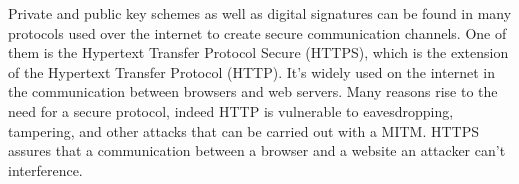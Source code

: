 Private and public key schemes as well as digital signatures can be found in many protocols used over the internet to create secure communication channels. One of them is the Hypertext Transfer Protocol Secure (HTTPS), which is the extension of the Hypertext Transfer Protocol (HTTP). It's widely used on the internet in the communication between browsers and web servers. Many reasons rise to the need for a secure protocol, indeed HTTP is vulnerable to eavesdropping, tampering, and other attacks that can be carried out with a MITM. HTTPS assures that a communication between a browser and a website an attacker can't interference.
